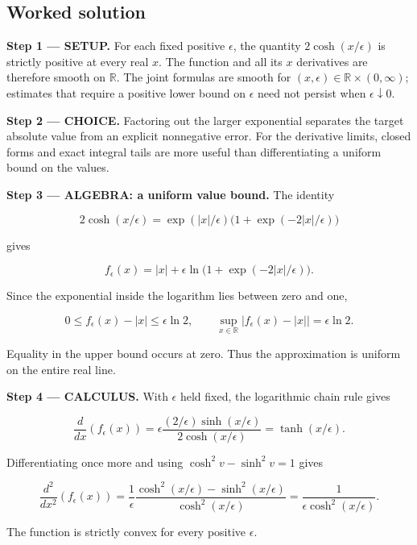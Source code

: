 \documentclass[11pt,oneside,openany]{book}
\begin{document}
\subsection*{Worked solution}

\textbf{Step 1 --- SETUP.} For each fixed positive \(\epsilon\), the quantity \(2\cosh(x/\epsilon)\) is strictly positive at every real \(x\). The function and all its \(x\) derivatives are therefore smooth on \(\mathbb R\). The joint formulas are smooth for \((x,\epsilon)\in\mathbb R\times(0,\infty)\); estimates that require a positive lower bound on \(\epsilon\) need not persist when \(\epsilon\downarrow0\).

\begin{ChoiceStep}
\textbf{Step 2 --- CHOICE.} Factoring out the larger exponential separates the target absolute value from an explicit nonnegative error. For the derivative limits, closed forms and exact integral tails are more useful than differentiating a uniform bound on the values.

\end{ChoiceStep}
\begingroup\color{AlgebraBlue}
\textbf{Step 3 --- ALGEBRA: a uniform value bound.} The identity

\[
2\cosh(x/\epsilon)
=\exp(|x|/\epsilon)\bigl(1+\exp(-2|x|/\epsilon)\bigr)
\]

gives

\[
f_\epsilon(x)=|x|+\epsilon\ln\bigl(1+\exp(-2|x|/\epsilon)\bigr).
\]

Since the exponential inside the logarithm lies between zero and one,

\[
0\le f_\epsilon(x)-|x|\le\epsilon\ln2,\qquad
\sup_{x\in\mathbb R}\bigl|f_\epsilon(x)-|x|\bigr|=\epsilon\ln2.
\]

Equality in the upper bound occurs at zero. Thus the approximation is uniform on the entire real line.

\endgroup
\textbf{Step 4 --- CALCULUS.} With \(\epsilon\) held fixed, the logarithmic chain rule gives

\[
\frac{d}{dx}\left(f_\epsilon(x)\right)
=\epsilon\frac{(2/\epsilon)\sinh(x/\epsilon)}{2\cosh(x/\epsilon)}
=\tanh(x/\epsilon).
\]

Differentiating once more and using \(\cosh^2v-\sinh^2v=1\) gives

\[
\frac{d^2}{dx^2}\left(f_\epsilon(x)\right)
=\frac1\epsilon\frac{\cosh^2(x/\epsilon)-\sinh^2(x/\epsilon)}{\cosh^2(x/\epsilon)}
=\frac1{\epsilon\cosh^2(x/\epsilon)}.
\]

The function is strictly convex for every positive \(\epsilon\).
\end{document}
